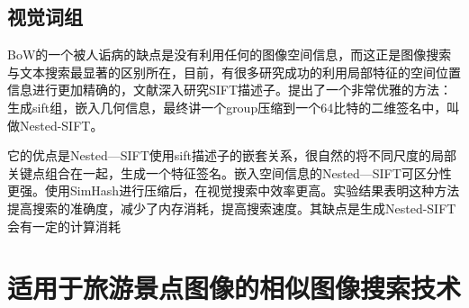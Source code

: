 \subsection{视觉词组}

BoW的一个被人诟病的缺点是没有利用任何的图像空间信息，而这正是图像搜索与文本搜索最显著的区别所在，目前，有很多研究成功的利用局部特征的空间位置信息进行更加精确的，文献\cite{Xu:2013wc}深入研究SIFT描述子。提出了一个非常优雅的方法：生成sift组，嵌入几何信息，最终讲一个group压缩到一个64比特的二维签名中，叫做Nested-SIFT。

它的优点是Nested—SIFT使用sift描述子的嵌套关系，很自然的将不同尺度的局部关键点组合在一起，生成一个特征签名。嵌入空间信息的Nested—SIFT可区分性更强。使用SimHash进行压缩后，在视觉搜索中效率更高。实验结果表明这种方法提高搜索的准确度，减少了内存消耗，提高搜索速度。其缺点是生成Nested-SIFT会有一定的计算消耗

\section{适用于旅游景点图像的相似图像搜索技术}

\ifx\usechapbib\empty
\nocite{BSTcontrol}


\fi